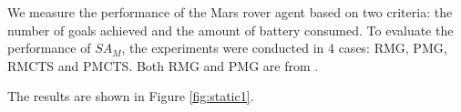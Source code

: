\documentclass[a0,landscape]{a0poster}
\newcommand{\SA}{\emph{SA}\xspace}
\newcommand{\SAM}{\emph{$SA_M$}\xspace}
\begin{document}
\begin{multicols}{4}
We measure the performance of the Mars rover agent based on two criteria: the number of goals achieved and the amount of battery consumed.
To evaluate the performance of \SAM, the experiments were conducted in 4 cases: RMG, PMG, RMCTS and PMCTS.
%
Both RMG and PMG are from \cite{DuffHT06}.
%
%
%
%
%


%

The results are shown in Figure \ref{fig:static1}.


\end{multicols}
\end{document}
